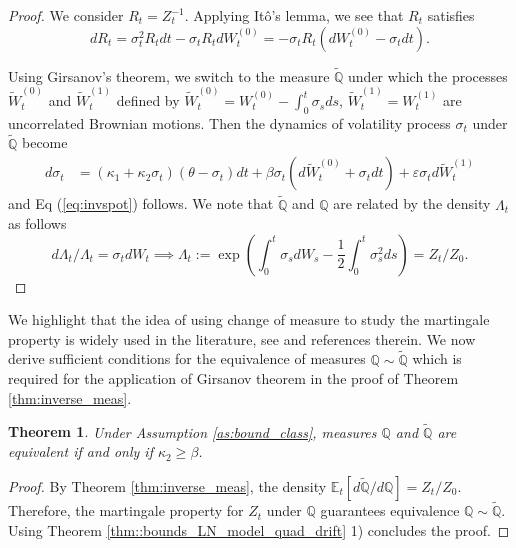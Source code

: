 \documentclass[11pt,a4paper] {article}
\newtheorem{theorem}{Theorem}[section]
\begin{document}
\begin{proof}
We consider $R_{t} = Z^{-1}_{t}$. Applying It\^{o}'s lemma, we see that $R_{t}$ satisfies 
\begin{equation*}
dR_t=\sigma_t^2 R_t  dt -\sigma_t R_t dW_t^{(0)}=
-\sigma_t R_t(dW_t^{(0)}-\sigma_tdt).
\end{equation*}

Using Girsanov's theorem, we switch to the measure $\mathbb{\tilde{Q}}$ under which the processes $\widetilde W^{(0)}_{t}$ and $\widetilde W^{(1)}_{t}$ defined by $\widetilde W^{(0)}_{t}= W^{(0)}_{t}-\int_0^t \sigma_sds$, $\widetilde W^{(1)}_{t}= W^{(1)}_{t}$ are uncorrelated Brownian motions. Then the dynamics of volatility process $\sigma_t$ under $\mathbb{\tilde{Q}}$ become
\begin{equation} \label {eq:svmd1_rev}
\begin{split}
d\sigma_{t}& =\left(\kappa_{1} + \kappa_{2}\sigma_{t} \right)(\theta - \sigma_{t})dt+  \beta  \sigma_{t}\left(d\widetilde W^{(0)}_{t}+\sigma_tdt\right)+  \varepsilon \sigma_{t} d\widetilde W^{(1)}_{t}
\end{split}
\end{equation}
and Eq (\ref{eq:invspot}) follows. We note that $\tilde{\mathbb{Q}}$ and $\mathbb{Q}$ are related by the density $\Lambda_t$ as follows
\begin{equation}\label{eq:density_process}
d\Lambda_t/\Lambda_t=\sigma_tdW_t  \implies 
\Lambda_t:= \exp\left(\int_0^t\sigma_s dW_s-\frac{1}{2}\int_0^t\sigma_s^2ds\right)=Z_t/Z_0. 
\end{equation}
\end{proof}

We highlight that the idea of using change of measure to study the martingale property is widely used in the literature, see \cite{Ruf2015} and references therein. We now derive sufficient conditions for the equivalence of measures $\mathbb{Q}\sim \tilde{\mathbb{Q}}$ which is required for the application of Girsanov theorem in the proof of Theorem \ref{thm:inverse_meas}. 

\begin{theorem}\label{thm::meas_equiv_quad_drift}
Under Assumption \ref{as:bound_class}, measures $\mathbb{Q}$ and $\tilde{\mathbb{Q}}$ are equivalent if and only if $\kappa_2\ge \beta$. 
\end{theorem}
\begin{proof}
By Theorem \ref{thm:inverse_meas}, the density $\mathbb{E}_t\left[d\tilde{\mathbb{Q}}/d\mathbb{Q}\right]=Z_t/Z_0$. Therefore, the martingale property for $Z_t$ under $\mathbb{Q}$ guarantees equivalence $\mathbb{Q}\sim \tilde{\mathbb{Q}}$. Using Theorem \ref{thm::bounds_LN_model_quad_drift} 1) concludes the proof. 
\end{proof}
\end{document}
